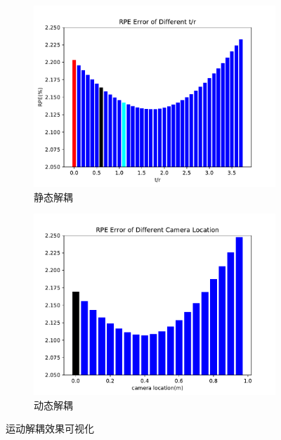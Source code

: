 \begin{figure}[ht]
    \centering
    \begin{subfigure}[b]{0.48\textwidth}
        \centering
        \includegraphics[width=\textwidth]{datavo/r_t_ratio.pdf}
        \caption{静态解耦}
        \label{fig:static_decouple}
    \end{subfigure}
    \begin{subfigure}[b]{0.48\textwidth}
        \centering
        \includegraphics[width=\textwidth]{datavo/r_t_ratio_2.pdf}
        \caption{动态解耦}
        \label{fig:dynamic_decouple}
    \end{subfigure}
    \caption{运动解耦效果可视化}
    \label{fig:r_t_ratio}
\end{figure}

